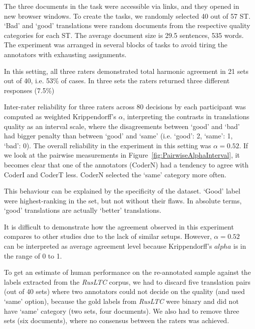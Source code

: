 
The three documents in the task were accessible via links, and they opened in new browser windows.
To create the tasks, we randomly selected 40 out of 57 ST. `Bad' and `good' translations were random documents from the respective quality categories for each ST. The average document size is 29.5 sentences, 535 words.  
The experiment was arranged in several blocks of tasks to avoid tiring the annotators with exhausting assignments. 

In this setting, all three raters demonstrated total harmonic agreement in 21 sets out of 40, i.e. 53\% of cases. In three sets the raters returned three different responses (7.5\%)

Inter-rater reliability for three raters across 80 decisions by each participant was computed as weighted Krippendorff's $\alpha$, interpreting the contrasts in translations quality as an interval scale, where the disagreements between `good' and `bad' had bigger penalty than between `good' and `same' (i.e. `good': 2, `same': 1, `bad': 0). The overall reliability in the experiment in this setting was $\alpha=0.52$.
If we look at the pairwise measurements in Figure~\ref{fig:PairwiseAlphaInterval}, it becomes clear that one of the annotators (CoderN) had a tendency to agree with CoderI and CoderT less. CoderN selected  the `same' category more often. 
\vspace{-2em}

This behaviour can be explained by the specificity of the dataset. `Good' label were highest-ranking in the set, but not without their flaws. In absolute terms, `good' translations are actually `better' translations.

It is difficult to demonstrate how the agreement observed in this experiment compares to other studies due to the lack of similar setups. However, $\alpha=0.52$ can be interpreted as average agreement level because Krippendorff's $alpha$ is in the range of 0 to 1. 

To get an estimate of human performance on the re-annotated sample against the labels extracted from the \textit{RusLTC} corpus, we had to discard five translation pairs (out of 40 sets) where two annotators could not decide on the quality (and used `same' option), because the gold labels from \textit{RusLTC} were binary and did not have `same' category (two sets, four documents). We also had to remove three sets (six documents), where no consensus between the raters was achieved. 

